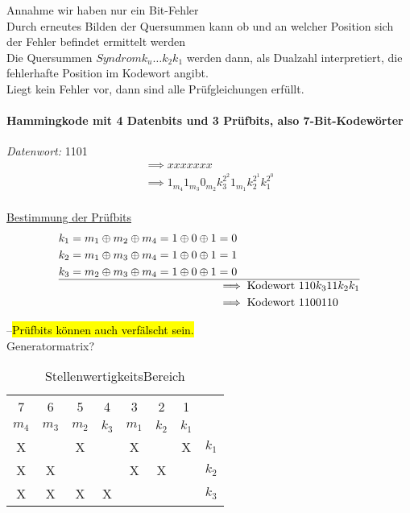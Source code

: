 \documentclass[a4paper]{scrartcl}
\begin{document}
					Annahme wir haben nur ein Bit-Fehler\\
					Durch erneutes Bilden der Quersummen kann ob und an welcher Position sich der Fehler befindet ermittelt werden \\
					Die Quersummen \( Syndrom k_u \dots k_2 k_1 \) werden dann, als Dualzahl interpretiert, die fehlerhafte Position im Kodewort angibt.\\
					Liegt kein Fehler vor,
					dann sind alle Prüfgleichungen erfüllt.\\
					
					\paragraph{Hammingkode mit 4 Datenbits und 3 Prüfbits, also 7-Bit-Kodewörter}
					\emph{Datenwort:} 1101
					\begin{align*}
						&\implies xxxxxxx&\\
						&\implies 1_{m_4} 1_{m_3} 0_{m_2} k_3^{2^2} 1_{m_1}  k_2^{2^1} k_1^{2^0}&\\
					\end{align*}
					
					\ul{Bestimmung der Prüfbits}\\
					\begin{align*}
						k_1 = m_1 \oplus m_2 \oplus m_4 = 1 \oplus 0 \oplus 1 &= 0\\
						k_2 = m_1 \oplus m_3 \oplus m_4 = 1 \oplus 0 \oplus 1 &= 1\\
						k_3 = m_2 \oplus m_3 \oplus m_4 = 1 \oplus 0 \oplus 1 &= 0\\ \hline
						&\implies \text{Kodewort } 110 k_3 11 k_2 k_1\\
						&\implies \text{Kodewort } 1100110\\
					\end{align*}
					
					--\hl{Prüfbits können auch verfälscht sein.} \\
					
					Generatormatrix? \\
					\begin{table}
						\centering
						\begin{tabular}{| c | c | c | c | c | c | c | c |}
							\hline
							7&6&5&4&3&2&1\\
							\(m_4\)&\(m_3\)&\(m_2\)&\(k_3\)&\(m_1\)&\(k_2\)&\(k_1\)\\ \hline
							X&&X&&X&&X&\(k_1\)\\
							X&X&&&X&X&&\(k_2\)\\
							X&X&X&X&&&&\(k_3\)\\ \hline
						\end{tabular}
						\caption{StellenwertigkeitsBereich}
					\end{table}
\end{document}
